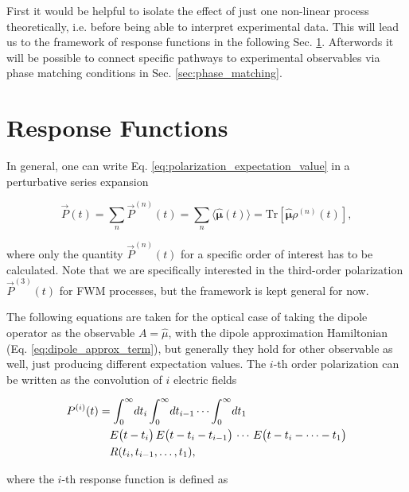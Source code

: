 \noindent
First it would be helpful to isolate the effect of just one non-linear process theoretically, i.e. before being able to interpret experimental data. 
This will lead us to the framework of response functions in the following Sec. \ref{sec:response_functions}. Afterwords it will be possible to connect specific pathways to experimental observables via phase matching conditions in Sec. \ref{sec:phase_matching}.

\section{Response Functions}
\label{sec:response_functions}
In general, one can write Eq. \eqref{eq:polarization_expectation_value} in a perturbative series expansion

\begin{equation}
	\vec{P}(t) = \sum_n \vec{P}^{(n)}(t) = \sum_n \langle \mathbf{\hat{\mu}}(t) \rangle = \mathrm{Tr}[\mathbf{\hat{\mu}} \rho^{(n)}(t)],
	\label{eq:polarization_expectation_value_perturbative}
\end{equation}

\noindent
where only the quantity $\vec{P}^{(n)}(t)$ for a specific order of interest has to be calculated. Note that we are specifically interested in the third-order polarization $\vec{P}^{(3)}(t)$ for FWM processes, but the framework is kept general for now.

\noindent
The following equations are taken for the optical case of taking the dipole operator as the observable $A = \hat{\mu}$, with the dipole approximation Hamiltonian (Eq. \eqref{eq:dipole_approx_term}), but generally they hold for other observable as well, just producing different expectation values. 
The $i$-th order polarization can be written as the convolution of $i$ electric fields \cite{hamm2005principlesnonlinearoptical}

\begin{align}
	P^{(i)}(t) &= \int_{0}^{\infty}\! dt_{i} \int_{0}^{\infty}\! dt_{i-1} \cdots \int_{0}^{\infty}\! dt_{1} \notag \\
	&\quad E\bigl(t-t_{i}\bigr)\, E\bigl(t-t_{i}-t_{i-1}\bigr)\,\cdots\, E\bigl(t-t_{i}-\cdots - t_{1}\bigr) \notag \\
	&\quad R(t_{i},t_{i-1},\ldots,t_{1}),
	\label{eq:response_convolution}
\end{align}

\noindent
where the $i$-th response function is defined as

